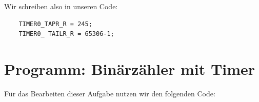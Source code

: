 \documentclass{report}
\begin{document}
Wir schreiben also in unseren Code:

\begin{verbatim}
    TIMER0_TAPR_R = 245;
    TIMER0_ TAILR_R = 65306-1;
\end{verbatim}



\section{Programm: Binärzähler mit Timer}


Für das Bearbeiten dieser Aufgabe nutzen wir den folgenden Code:
\end{document}
